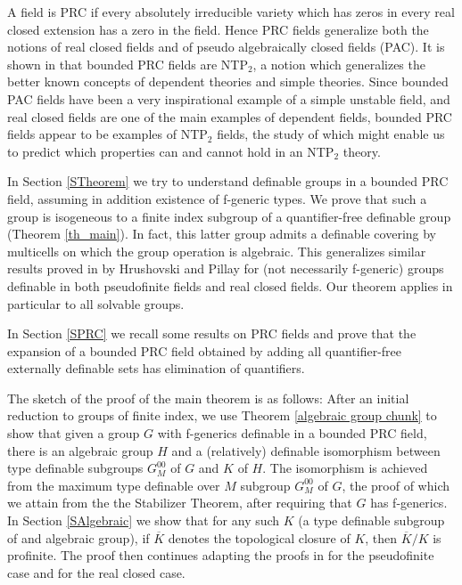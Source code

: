 \documentclass[12pt]{article}
\theoremstyle{definition}
\theoremstyle{mystyle}
\theoremstyle{remark}
\begin{document}
A field is PRC if every absolutely irreducible variety which has
zeros in every real closed extension has a zero in the field.
Hence PRC fields generalize both the notions of real closed fields
and of pseudo algebraically closed fields (PAC). It is shown in
\cite{Mon} that bounded PRC fields are NTP$_2$, a notion which
generalizes the better known concepts of dependent theories and
simple theories.   Since bounded PAC fields have been a very
inspirational example of a simple unstable field,  and real closed
fields are one of the main examples of dependent fields, bounded
PRC fields appear to be examples of NTP$_2$ fields, the study of
which might enable us to predict which properties can and cannot
hold in an NTP$_2$ theory.

In Section \ref{STheorem} we try to understand definable groups in a bounded
PRC field, assuming in addition existence of f-generic types. We prove
that such a group is isogeneous to a finite index subgroup of a
quantifier-free definable group (Theorem \ref{th_main}). In fact,
this latter group admits a definable covering by multicells on
which the group operation is algebraic. This generalizes similar
results proved in \cite{HrPi} by Hrushovski and Pillay for (not
necessarily f-generic) groups definable in both pseudofinite
fields and real closed fields. Our theorem applies in particular
to all solvable groups.

In Section \ref{SPRC} we recall some results on PRC fields and
prove that the expansion of a bounded PRC field obtained by adding
all quantifier-free externally definable sets has elimination of
quantifiers.

The sketch of the proof of the main theorem is as follows: After
an initial reduction to groups of finite index, we use Theorem
\ref{algebraic group chunk} to show that given a group $G$ with
f-generics definable in a bounded PRC field, there is an algebraic
group $H$ and a (relatively) definable isomorphism between type
definable subgroups $G^{00}_M$ of $G$ and $K$ of $H$. The
isomorphism is achieved from the maximum type definable over $M$
subgroup $G^{00}_M$ of $G$, the proof of which we attain from the
the Stabilizer Theorem, after requiring that $G$ has f-generics.
In Section \ref{SAlgebraic} we show that for any such $K$ (a type
definable subgroup of and algebraic group), if $\overline{K}$
denotes the topological closure of  $K$, then $\overline{K}/K$ is
profinite. The proof then continues adapting the proofs in
\cite{HrPi} for the pseudofinite case and for the real closed case.
\end{document}
